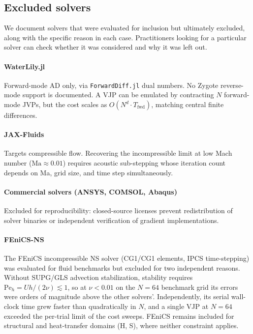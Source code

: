 \subsection{Excluded solvers}
\label{app:excluded}

We document solvers that were evaluated for inclusion but ultimately
excluded, along with the specific reason in each case. Practitioners
looking for a particular solver can check whether it was considered and
why it was left out.

\paragraph{WaterLily.jl~\cite{waterlily2024}}
Forward-mode AD only, via \texttt{ForwardDiff.jl} dual numbers. No
Zygote reverse-mode support is documented. A VJP can be emulated by
contracting $N$ forward-mode JVPs, but the cost scales as
$O(N^d \cdot T_{\mathrm{fwd}})$, matching central finite differences.

\paragraph{JAX-Fluids~\cite{jaxfluids2022}}
Targets compressible flow. Recovering the incompressible limit at low Mach
number ($\mathrm{Ma} \approx 0.01$) requires acoustic sub-stepping whose
iteration count depends on Ma, grid size, and time step simultaneously.

\paragraph{Commercial solvers (ANSYS, COMSOL, Abaqus)}
Excluded for reproducibility: closed-source licenses prevent redistribution
of solver binaries or independent verification of gradient implementations.

\paragraph{FEniCS-NS~\cite{alnaes2015fenics}}
The FEniCS incompressible NS solver (CG1/CG1 elements, IPCS time-stepping)
was evaluated for fluid benchmarks but excluded for two independent reasons.
Without SUPG/GLS advection stabilization, stability requires
$\mathrm{Pe}_h = Uh/(2\nu) \lesssim 1$, so at $\nu < 0.01$ on the $N=64$
benchmark grid its errors were orders of magnitude above the other solvers'.
Independently, its serial wall-clock time grew faster than quadratically in
$N$, and a single VJP at $N=64$ exceeded the per-trial limit of the cost
sweeps.
FEniCS remains included for structural and heat-transfer domains (H, S),
where neither constraint applies.

